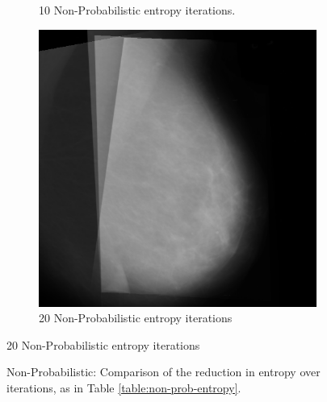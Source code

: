 \begin{figure}[H]
\begin{subfigure}[t]{0.3\textwidth}
        \caption{10 Non-Probabilistic entropy iterations.}
        \label{fig:10-nonProb}
    \end{subfigure} \hfill
    \begin{subfigure}[t]{0.3\textwidth}
      \includegraphics[width=\textwidth]{Chapter3/nonProb-img/nonProb20.png}
      \caption{20 Non-Probabilistic entropy iterations}
      \label{fig:20-nonProb}
    \end{subfigure}
\end{figure}

\begin{figure}[H]
  \begin{center}

    \caption{Non-Probabilistic: Comparison of the reduction in entropy over iterations, as in Table \ref{table:non-prob-entropy}.}
  \end{center}
\end{figure}


